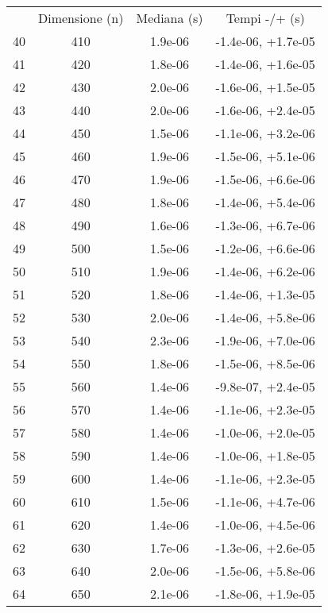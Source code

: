 \begin{table}
\centering
\begin{adjustbox}{width=1\textwidth/2}
\begin{tabular}{|c|c|c|c|}
\hline
 & Dimensione (n) & Mediana (s) & Tempi -/+ (s) \\
40 & 410 & 1.9e-06 & -1.4e-06, +1.7e-05 \\
\cline{1-4}
41 & 420 & 1.8e-06 & -1.4e-06, +1.6e-05 \\
\cline{1-4}
42 & 430 & 2.0e-06 & -1.6e-06, +1.5e-05 \\
\cline{1-4}
43 & 440 & 2.0e-06 & -1.6e-06, +2.4e-05 \\
\cline{1-4}
44 & 450 & 1.5e-06 & -1.1e-06, +3.2e-06 \\
\cline{1-4}
45 & 460 & 1.9e-06 & -1.5e-06, +5.1e-06 \\
\cline{1-4}
46 & 470 & 1.9e-06 & -1.5e-06, +6.6e-06 \\
\cline{1-4}
47 & 480 & 1.8e-06 & -1.4e-06, +5.4e-06 \\
\cline{1-4}
48 & 490 & 1.6e-06 & -1.3e-06, +6.7e-06 \\
\cline{1-4}
49 & 500 & 1.5e-06 & -1.2e-06, +6.6e-06 \\
\cline{1-4}
50 & 510 & 1.9e-06 & -1.4e-06, +6.2e-06 \\
\cline{1-4}
51 & 520 & 1.8e-06 & -1.4e-06, +1.3e-05 \\
\cline{1-4}
52 & 530 & 2.0e-06 & -1.4e-06, +5.8e-06 \\
\cline{1-4}
53 & 540 & 2.3e-06 & -1.9e-06, +7.0e-06 \\
\cline{1-4}
54 & 550 & 1.8e-06 & -1.5e-06, +8.5e-06 \\
\cline{1-4}
55 & 560 & 1.4e-06 & -9.8e-07, +2.4e-05 \\
\cline{1-4}
56 & 570 & 1.4e-06 & -1.1e-06, +2.3e-05 \\
\cline{1-4}
57 & 580 & 1.4e-06 & -1.0e-06, +2.0e-05 \\
\cline{1-4}
58 & 590 & 1.4e-06 & -1.0e-06, +1.8e-05 \\
\cline{1-4}
59 & 600 & 1.4e-06 & -1.1e-06, +2.3e-05 \\
\cline{1-4}
60 & 610 & 1.5e-06 & -1.1e-06, +4.7e-06 \\
\cline{1-4}
61 & 620 & 1.4e-06 & -1.0e-06, +4.5e-06 \\
\cline{1-4}
62 & 630 & 1.7e-06 & -1.3e-06, +2.6e-05 \\
\cline{1-4}
63 & 640 & 2.0e-06 & -1.5e-06, +5.8e-06 \\
\cline{1-4}
64 & 650 & 2.1e-06 & -1.8e-06, +1.9e-05 \\

\end{tabular}
\end{adjustbox}
\end{table}

